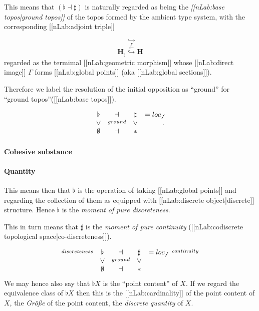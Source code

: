 \documentclass[12pt,titlepage]{article}
\newcommand{\itexarray}[1]{\begin{matrix}#1\end{matrix}}
\theoremstyle{plain}
\theoremstyle{definition}
\theoremstyle{remark}
\begin{document}
This means that $(\flat \dashv \sharp)$ is naturally regarded as being the \emph{[[nLab:base topos|ground topos]]} of the topos formed by the ambient type system, with the corresponding [[nLab:adjoint triple]]

\begin{displaymath}
\mathbf{H}_{\sharp}
  \stackrel{\hookrightarrow}{\stackrel{\stackrel{\Gamma}{\longleftarrow}}{\hookrightarrow}}
  \mathbf{H}
\end{displaymath}
regarded as the termimal [[nLab:geometric morphism]] whose [[nLab:direct image]] $\Gamma$ forms [[nLab:global points]] (aka [[nLab:global sections]]).

Therefore we label the resolution of the initial opposition as ``ground'' for ``ground topos''([[nLab:base topos]]).

\begin{displaymath}
\itexarray{
     \flat &\dashv& \sharp & = loc_{\not\not}
     \\
     \vee &\stackrel{ground}{}& \vee
     \\
     \emptyset &\dashv& \ast
  }
  \,.
\end{displaymath}
\hypertarget{cohesive_substance}{}\paragraph*{{Cohesive substance}}\label{cohesive_substance}

\hypertarget{IntensiveExtensive}{}\paragraph*{{Quantity}}\label{IntensiveExtensive}

This means then that $\flat$ is the operation of taking [[nLab:global points]] and regarding the collection of them as equipped with [[nLab:discrete object|discrete]] structure. Hence $\flat$ is the \emph{moment of pure discreteness}.

This in turn means that $\sharp$ is the \emph{moment of pure continuity} ([[nLab:codiscrete topological space|co-discreteness]]).

\begin{displaymath}
\itexarray{
     \stackrel{discreteness}{} & \flat &\dashv& \sharp &= loc_{\not\not}& \stackrel{continuity}{}
     \\
     & \vee &\stackrel{ground}{}& \vee
     \\
     & \emptyset &\dashv& \ast &
  }
\end{displaymath}
We may hence also say that $\flat X$ is the ``point content'' of $X$. If we regard the equivalence class of $\flat X$ then this is the [[nLab:cardinality]] of the point content of $X$, the \emph{Größe} of the point content, the \emph{discrete quantity} of $X$.
\end{document}
